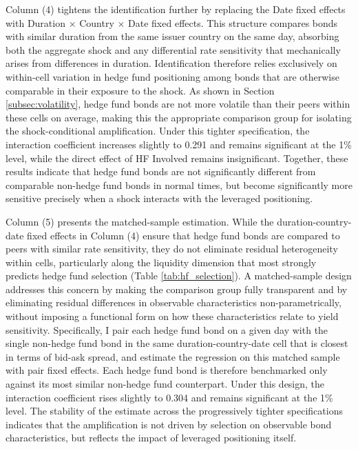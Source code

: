\documentclass[english, 11pt, oneside]{article}
\begin{document}
Column (4) tightens the identification further by replacing the Date fixed effects with Duration $\times$ Country $\times$ Date fixed effects. This structure compares bonds with similar duration from the same issuer country on the same day, absorbing both the aggregate shock and any differential rate sensitivity that mechanically arises from differences in duration. Identification therefore relies exclusively on within-cell variation in hedge fund positioning among bonds that are otherwise comparable in their exposure to the shock. As shown in Section \ref{subsec:volatility}, hedge fund bonds are not more volatile than their peers within these cells on average, making this the appropriate comparison group for isolating the shock-conditional amplification. Under this tighter specification, the interaction coefficient increases slightly to 0.291 and remains significant at the 1\% level, while the direct effect of HF Involved remains insignificant. Together, these results indicate that hedge fund bonds are not significantly different from comparable non-hedge fund bonds in normal times, but become significantly more sensitive precisely when a shock interacts with the leveraged positioning.

Column (5) presents the matched-sample estimation. While the duration-country-date fixed effects in Column (4) ensure that hedge fund bonds are compared to peers with similar rate sensitivity, they do not eliminate residual heterogeneity within cells, particularly along the liquidity dimension that most strongly predicts hedge fund selection (Table \ref{tab:hf_selection}). A matched-sample design addresses this concern by making the comparison group fully transparent and by eliminating residual differences in observable characteristics non-parametrically, without imposing a functional form on how these characteristics relate to yield sensitivity. Specifically, I pair each hedge fund bond on a given day with the single non-hedge fund bond in the same duration-country-date cell that is closest in terms of bid-ask spread, and estimate the regression on this matched sample with pair fixed effects. Each hedge fund bond is therefore benchmarked only against its most similar non-hedge fund counterpart. Under this design, the interaction coefficient rises slightly to 0.304 and remains significant at the 1\% level. The stability of the estimate across the progressively tighter specifications indicates that the amplification is not driven by selection on observable bond characteristics, but reflects the impact of leveraged positioning itself.
\end{document}
